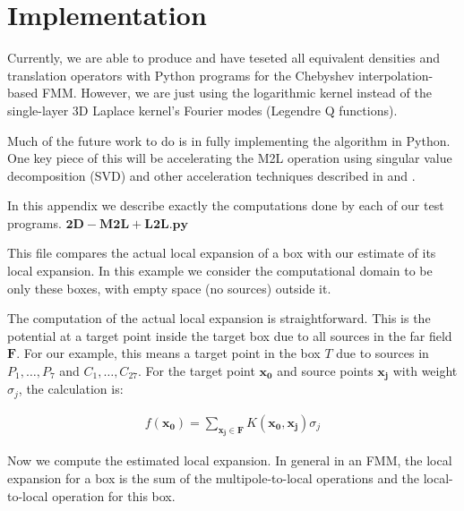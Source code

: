 \documentclass[11pt, oneside]{article}   	%
\begin{document}
\section{Implementation}
Currently, we are able to produce and have teseted all equivalent densities and translation operators with Python programs for the Chebyshev interpolation-based FMM. However, we are just using the logarithmic kernel instead of the single-layer 3D Laplace kernel's Fourier modes (Legendre Q functions).

Much of the future work to do is in fully implementing the algorithm in Python. One key piece of this will be accelerating the M2L operation using singular value decomposition (SVD) and other acceleration techniques described in \cite{MV} and \cite{FD}.

In this appendix we describe exactly the computations done by each of our test programs.
$\mathbf{2D-M2L+L2L.py}$

This file compares the actual local expansion of a box with our estimate of its local expansion. In this example we consider the computational domain to be only these boxes, with empty space (no sources) outside it.

The computation of the actual local expansion is straightforward. This is the potential at a target point inside the target box due to all sources in the far field $\mathbf{F}$. For our example, this means a target point in the box $T$ due to sources in $P_1,\dots,P_7$ and $C_1,\dots,C_{27}$. For the target point $\mathbf{x_0}$ and source points $\mathbf{x_j}$ with weight $\sigma_j$, the calculation is:

\begin{align}
f(\mathbf{x_0}) = \sum_{\mathbf{x_j}\in \mathbf{F}} K(\mathbf{x_0},\mathbf{x_j})\sigma_j
\end{align}

Now we compute the estimated local expansion. In general in an FMM, the local expansion for a box is the sum of the multipole-to-local operations and the local-to-local operation for this box.
\end{document}
